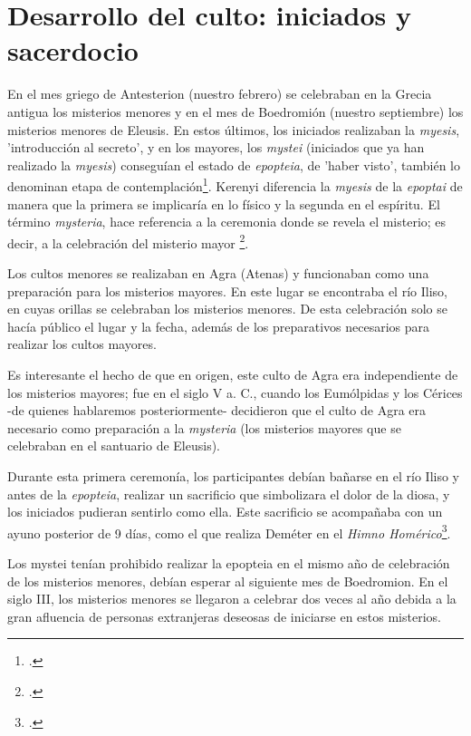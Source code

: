 \section{Desarrollo del culto: iniciados y sacerdocio}

En el mes griego de Antesterion (nuestro febrero) se celebraban en la Grecia antigua los misterios menores y en el mes de Boedromión (nuestro septiembre) los misterios menores de Eleusis. En estos últimos, los iniciados realizaban la \textit{myesis}, 'introducción al secreto', y en los mayores, los \textit{mystei} (iniciados que ya han realizado la \textit{myesis}) conseguían el estado de \textit{epopteia}, de 'haber visto', también lo denominan etapa de contemplación\footcite[382]{burkertReligionGriegaArcaica2007}. Kerenyi diferencia la \textit{myesis} de la \textit{epoptai} de manera que la primera se implicaría  en lo físico y la segunda en el espíritu. El término \textit{mysteria}, hace referencia a la ceremonia donde se revela el misterio; es decir, a la celebración del misterio mayor \footcite[68-70]{kerenyiEleusisImagenArquetipica2004}.

Los cultos menores se realizaban en Agra (Atenas) y funcionaban como una preparación para los misterios mayores. En este lugar se encontraba el río Iliso, en cuyas orillas se celebraban los misterios menores. De esta celebración solo se hacía público el lugar y la fecha, además de los preparativos necesarios para realizar los cultos mayores. 

Es interesante el hecho de que en origen, este culto de Agra era independiente de los misterios mayores; fue en el siglo V a. C., cuando los Eumólpidas y los Cérices -de quienes hablaremos posteriormente- decidieron que el culto de Agra era necesario como preparación a la \textit{mysteria} (los misterios mayores que se celebraban en el santuario de Eleusis). 

Durante esta primera ceremonía, los participantes debían bañarse en el río Iliso y antes de la \textit{epopteia}, realizar un sacrificio que simbolizara el dolor de la diosa, y los iniciados pudieran sentirlo como ella. Este sacrificio se acompañaba con un ayuno posterior de 9 días, como el que realiza Deméter en el \textit{Himno Homérico}\footcite[53]{b.torresHimnoHomericoDemeter2001}.

Los mystei tenían prohibido realizar la epopteia en el mismo año de celebración de los misterios menores, debían esperar al siguiente mes de Boedromion. En el siglo III, los misterios menores se llegaron a celebrar dos veces al año debida a la gran afluencia de personas extranjeras deseosas de iniciarse en estos misterios.

